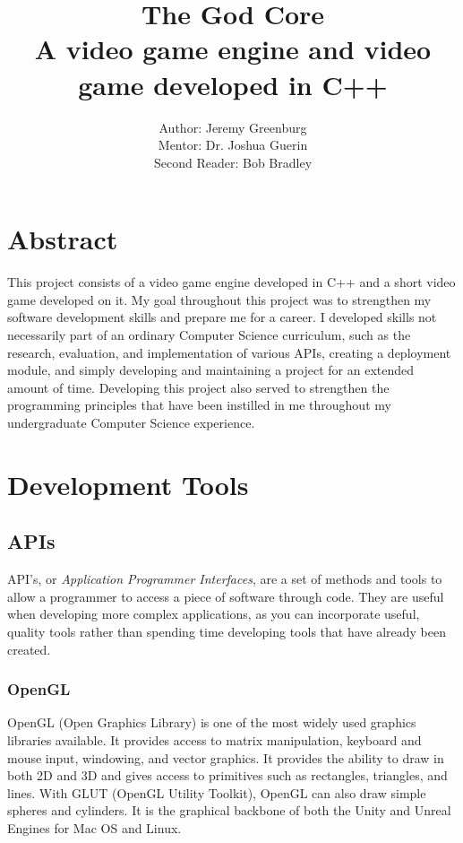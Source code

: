 \documentclass{article}
\author{Author: Jeremy Greenburg \\ Mentor: Dr. Joshua Guerin \\ Second Reader: Bob Bradley}
\title{The God Core \\ A video game engine and video game developed in C++}
\begin{document}
\maketitle
\pagebreak

\tableofcontents

\pagebreak

\section{Abstract}

This project consists of a video game engine developed in C++ and a short video game developed on it. My goal throughout this project was to strengthen my software development skills and prepare me for a career. I developed skills not necessarily part of an ordinary Computer Science curriculum, such as the research, evaluation, and implementation of various APIs, creating a deployment module, and simply developing and maintaining a project for an extended amount of time. Developing this project also served to strengthen the programming principles that have been instilled in me throughout my undergraduate Computer Science experience.

\pagebreak

\section{Development Tools} \label{sec:DevelopmentTools}

\subsection{APIs} \label{subsec:API}

API's, or \emph{Application Programmer Interfaces}, are a set of methods and tools to allow a programmer to access a piece of software through code. They are useful when developing more complex applications, as you can incorporate useful, quality tools rather than spending time developing tools that have already been created.

\subsubsection{OpenGL} \label{subsubsec:OpenGL}

OpenGL (Open Graphics Library) is one of the most widely used graphics libraries available. It provides access to matrix manipulation, keyboard and mouse input, windowing, and vector graphics. It provides the ability to draw in both 2D and 3D and gives access to primitives such as rectangles, triangles, and lines. With GLUT (OpenGL Utility Toolkit), OpenGL can also draw simple spheres and cylinders. It is the graphical backbone of both the Unity and Unreal Engines for Mac OS and Linux.
\end{document}
